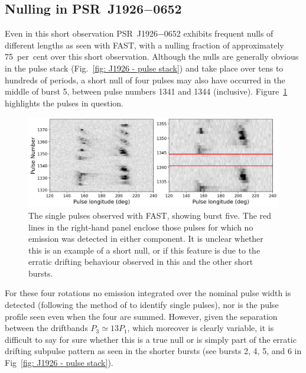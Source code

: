 \subsection{Nulling in \texorpdfstring{PSR~J1926$-$0652}{PSR~J1926--0652}}
\label{sec: J1926 - analysis - nulling}
Even in this short observation PSR~J1926$-$0652 exhibits frequent nulls of different lengths as seen with FAST, with a nulling fraction of approximately 75~per~cent over this short observation. Although the nulls are generally obvious in the pulse stack (Fig.~\ref{fig: J1926 - pulse stack}) and take place over tens to hundreds of periods, a short null of four pulses may also have occurred in the middle of burst 5, between pulse numbers 1341 and 1344 (inclusive). Figure~\ref{fig: J1926 - burst five null} highlights the pulses in question.
\begin{figure}
    \begin{center}
        \includegraphics[width=1.0\textwidth]{Figures/J1926/burst_5}
        \caption[Burst 5 of PSR~J1926$-$0652 showing the possible null]{The single pulses observed with FAST, showing burst five. The red lines in the right-hand panel enclose those pulses for which no emission was detected in either component. It is unclear whether this is an example of a short null, or if this feature is due to the erratic drifting behaviour observed in this and the other short bursts.}
        \label{fig: J1926 - burst five null}
    \end{center}
\end{figure}
For these four rotations no emission integrated over the nominal pulse width is detected (following the method of \citet{BGGx2010} to identify single pulses), nor is the pulse profile seen even when the four are summed.
However, given the separation between the driftbands $P_3 \simeq 13P_1$, which moreover is clearly variable, it is  difficult to say for sure whether this is a true null or is simply part of the erratic drifting subpulse pattern as seen in the shorter bursts (see bursts 2, 4, 5, and 6 in Fig~\ref{fig: J1926 - pulse stack}).

